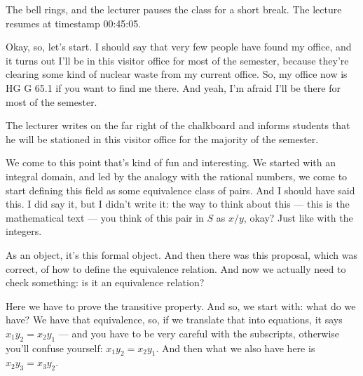 \begin{pause}
The bell rings, and the lecturer pauses the class for a short break. The lecture resumes at timestamp 00:45:05.
\end{pause}

\begin{speech}[00:45:05 - 00:45:33]
Okay, so, let's start. I should say that very few people have found my office, and it turns out I'll be in this visitor office for most of the semester, because they're clearing some kind of nuclear waste from my current office. So, my office now is HG G 65.1  if you want to find me there. And yeah, I'm afraid I'll be there for most of the semester.
\end{speech}

\begin{note}
The lecturer writes  on the far right of the chalkboard and informs students that he will be stationed in this visitor office for the majority of the semester.
\end{note}

\begin{speech}[00:45:33 - 00:47:00]
We come to this point that's kind of fun and interesting. We started with an integral domain, and led by the analogy with the rational numbers, we come to start defining this field as some equivalence class of pairs. And I should have said this. I did say it, but I didn't write it: the way to think about this  --- this is the mathematical text --- you think of this pair in $S$ as $x/y$, okay? Just like with the integers.

As an object, it's this formal object. And then there was this proposal, which was correct, of how to define the equivalence relation. And now we actually need to check something: is it an equivalence relation?

Here we have to prove the transitive property. And so, we start with: what do we have? We have that equivalence, so, if we translate that into equations, it says $x_1 y_2 = x_2 y_1$ --- and you have to be very careful with the subscripts, otherwise you'll confuse yourself:  $x_1 y_2 = x_2 y_1$. And then what we also have here is $x_2 y_3 = x_3 y_2$. 
\end{speech}

